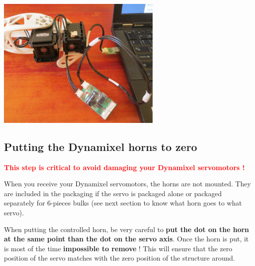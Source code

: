 \documentclass[includefoot]{article}
\begin{document}
 \begin{center}
  \includegraphics[width=0.6\textwidth]{img/daisy_link}
 \end{center}
 

\subsection{Putting the Dynamixel horns to zero}
\label{dynamixel-zero}

\textcolor{red}{\textbf{This step is critical to avoid damaging your Dynamixel servomotors !}}

When you receive your Dynamixel servomotors, the horns are not mounted. They are included in the packaging if the servo is packaged alone or packaged separately for 6-pieces bulks (see next section to know what horn goes to what servo).

When putting the controlled horn, be very careful to \textbf{put the dot on the horn at the same point than the dot on the servo axis}. Once the horn is put, it is most of the time \textbf{impossible to remove} ! This will ensure that the zero position of the servo matches with the zero position of the structure around.
\end{document}
